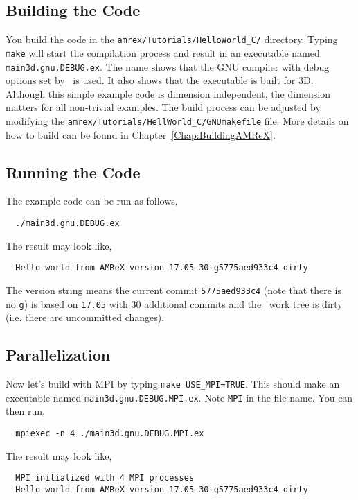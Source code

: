 \subsection{Building the Code}

You build the code in the {\tt amrex/Tutorials/HelloWorld\_C/}
directory.  Typing {\tt make} will start the compilation process and
result in an executable named {\tt main3d.gnu.DEBUG.ex}.  The name
shows that the GNU compiler with debug options set by \amrex\ is used.
It also shows that the executable is built for 3D.  Although this
simple example code is dimension independent, the dimension matters
for all non-trivial examples.  The build process can be adjusted by
modifying the {\tt amrex/Tutorials/HellWorld\_C/GNUmakefile} file.
More details on how to build \amrex can be found in
Chapter~\ref{Chap:BuildingAMReX}.

\subsection{Running the Code}

The example code can be run as follows,
\begin{verbatim}
  ./main3d.gnu.DEBUG.ex
\end{verbatim}
The result may look like,
\begin{verbatim}
  Hello world from AMReX version 17.05-30-g5775aed933c4-dirty
\end{verbatim}
The version string means the current commit {\tt 5775aed933c4} (note
that there is no {\tt g}) is based on {\tt 17.05} with 30 additional
commits and the \amrex\ work tree is dirty (i.e. there are uncommitted
changes).

\subsection{Parallelization}

Now let's build with MPI by typing {\tt make USE\_MPI=TRUE}.  This
should make an executable named {\tt main3d.gnu.DEBUG.MPI.ex}.  Note
{\tt MPI} in the file name.  You can then run,
\begin{verbatim}
  mpiexec -n 4 ./main3d.gnu.DEBUG.MPI.ex
\end{verbatim}
The result may look like,
\begin{verbatim}
  MPI initialized with 4 MPI processes
  Hello world from AMReX version 17.05-30-g5775aed933c4-dirty
\end{verbatim}

